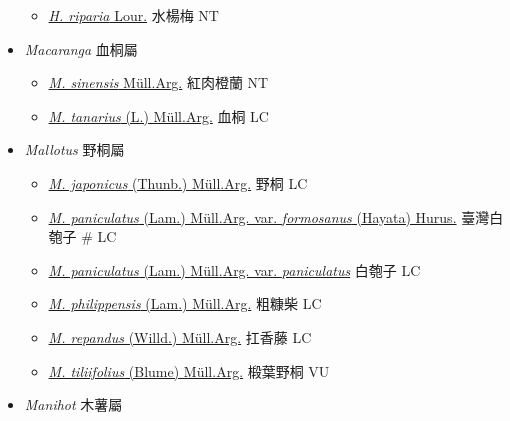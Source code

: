 \begin{itemize}
  \begin{itemize}
        \item[] \href{http://www.theplantlist.org/tpl1.1/search?q=Homonoia+riparia}{\textit{H. riparia} Lour.}   水楊梅   NT
  \end{itemize}
 \item[] \textit{Macaranga} 血桐屬
                                
  \begin{itemize}
        \item[] \href{http://www.theplantlist.org/tpl1.1/search?q=Macaranga+sinensis}{\textit{M. sinensis} Müll.Arg.}   紅肉橙蘭   NT
        \item[] \href{http://www.theplantlist.org/tpl1.1/search?q=Macaranga+tanarius}{\textit{M. tanarius} (L.) Müll.Arg.}   血桐   LC
  \end{itemize}
 \item[] \textit{Mallotus} 野桐屬
                                
  \begin{itemize}
        \item[] \href{http://www.theplantlist.org/tpl1.1/search?q=Mallotus+japonicus}{\textit{M. japonicus} (Thunb.) Müll.Arg.}   野桐   LC
        \item[] \href{http://www.theplantlist.org/tpl1.1/search?q=Mallotus+paniculatus+var.+formosanus}{\textit{M. paniculatus} (Lam.) Müll.Arg. var. \textit{formosanus} (Hayata) Hurus.}   臺灣白匏子  \# LC
        \item[] \href{http://www.theplantlist.org/tpl1.1/search?q=Mallotus+paniculatus+var.+paniculatus}{\textit{M. paniculatus} (Lam.) Müll.Arg. var. \textit{paniculatus}}   白匏子   LC
        \item[] \href{http://www.theplantlist.org/tpl1.1/search?q=Mallotus+philippensis}{\textit{M. philippensis} (Lam.) Müll.Arg.}   粗糠柴   LC
        \item[] \href{http://www.theplantlist.org/tpl1.1/search?q=Mallotus+repandus}{\textit{M. repandus} (Willd.) Müll.Arg.}   扛香藤   LC
        \item[] \href{http://www.theplantlist.org/tpl1.1/search?q=Mallotus+tiliifolius}{\textit{M. tiliifolius} (Blume) Müll.Arg.}   椴葉野桐   VU
  \end{itemize}
 \item[] \textit{Manihot} 木薯屬
                                

\end{itemize}
